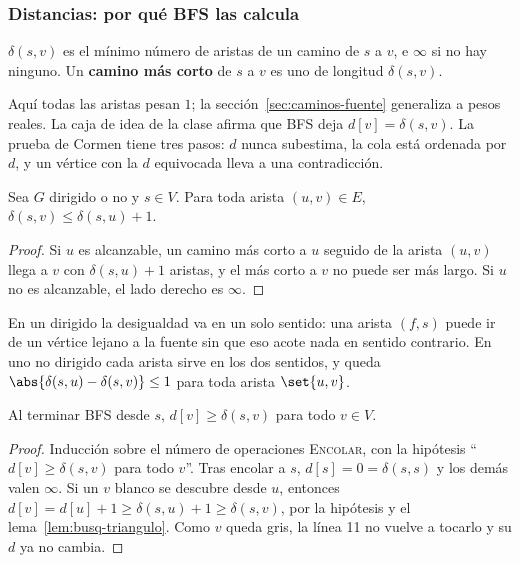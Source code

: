 \documentclass[11pt,letterpaper]{article}
\begin{document}
\subsubsection*{Distancias: por qué BFS las calcula}

\begin{definicion}
  $\delta(s, v)$ es el mínimo número de aristas de un camino de $s$ a
  $v$, e $\infty$ si no hay ninguno. Un \textbf{camino más corto} de
  $s$ a $v$ es uno de longitud $\delta(s, v)$.
\end{definicion}

Aquí todas las aristas pesan $1$; la sección~\ref{sec:caminos-fuente}
generaliza a pesos reales. La caja de idea de la clase afirma que BFS
deja $d[v] = \delta(s, v)$. La prueba de Cormen tiene tres pasos: $d$
nunca subestima, la cola está ordenada por $d$, y un vértice con la
$d$ equivocada lleva a una contradicción.

\begin{lema}
  \label{lem:busq-triangulo}
  Sea $G$ dirigido o no y $s \in V$. Para toda arista $(u, v) \in E$,
  $\delta(s, v) \leq \delta(s, u) + 1$.
\end{lema}

\begin{proof}
  Si $u$ es alcanzable, un camino más corto a $u$ seguido de la arista
  $(u, v)$ llega a $v$ con $\delta(s, u) + 1$ aristas, y el más corto
  a $v$ no puede ser más largo. Si $u$ no es alcanzable, el lado
  derecho es $\infty$.
\end{proof}

En un dirigido la desigualdad va en un solo sentido: una arista
$(f, s)$ puede ir de un vértice lejano a la fuente sin que eso acote
nada en sentido contrario. En uno no dirigido cada arista sirve en
los dos sentidos, y queda
$\abs{\delta(s, u) - \delta(s, v)} \leq 1$ para toda arista
$\set{u, v}$.

\begin{lema}
  \label{lem:busq-cota-d}
  Al terminar BFS desde $s$, $d[v] \geq \delta(s, v)$ para todo
  $v \in V$.
\end{lema}

\begin{proof}
  Inducción sobre el número de operaciones \textsc{Encolar}, con la
  hipótesis ``$d[v] \geq \delta(s, v)$ para todo $v$''. Tras encolar
  a $s$, $d[s] = 0 = \delta(s, s)$ y los demás valen $\infty$. Si un
  $v$ blanco se descubre desde $u$, entonces
  $d[v] = d[u] + 1 \geq \delta(s, u) + 1 \geq \delta(s, v)$, por la
  hipótesis y el lema~\ref{lem:busq-triangulo}. Como $v$ queda gris,
  la línea 11 no vuelve a tocarlo y su $d$ ya no cambia.
\end{proof}
\end{document}

